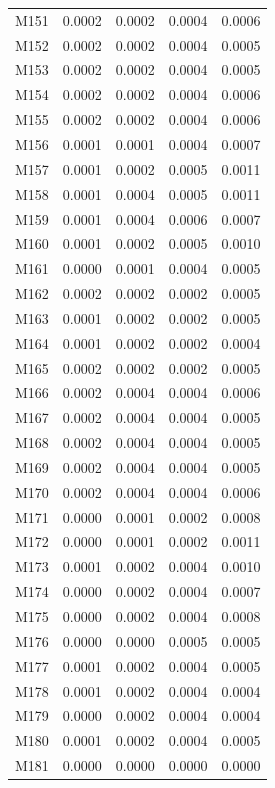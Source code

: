 \begin{longtable}{lrrrr}
M151 & 0.0002 & 0.0002 & 0.0004 & 0.0006 \\
M152 & 0.0002 & 0.0002 & 0.0004 & 0.0005 \\
M153 & 0.0002 & 0.0002 & 0.0004 & 0.0005 \\
M154 & 0.0002 & 0.0002 & 0.0004 & 0.0006 \\
M155 & 0.0002 & 0.0002 & 0.0004 & 0.0006 \\
M156 & 0.0001 & 0.0001 & 0.0004 & 0.0007 \\
M157 & 0.0001 & 0.0002 & 0.0005 & 0.0011 \\
M158 & 0.0001 & 0.0004 & 0.0005 & 0.0011 \\
M159 & 0.0001 & 0.0004 & 0.0006 & 0.0007 \\
M160 & 0.0001 & 0.0002 & 0.0005 & 0.0010 \\
M161 & 0.0000 & 0.0001 & 0.0004 & 0.0005 \\
M162 & 0.0002 & 0.0002 & 0.0002 & 0.0005 \\
M163 & 0.0001 & 0.0002 & 0.0002 & 0.0005 \\
M164 & 0.0001 & 0.0002 & 0.0002 & 0.0004 \\
M165 & 0.0002 & 0.0002 & 0.0002 & 0.0005 \\
M166 & 0.0002 & 0.0004 & 0.0004 & 0.0006 \\
M167 & 0.0002 & 0.0004 & 0.0004 & 0.0005 \\
M168 & 0.0002 & 0.0004 & 0.0004 & 0.0005 \\
M169 & 0.0002 & 0.0004 & 0.0004 & 0.0005 \\
M170 & 0.0002 & 0.0004 & 0.0004 & 0.0006 \\
M171 & 0.0000 & 0.0001 & 0.0002 & 0.0008 \\
M172 & 0.0000 & 0.0001 & 0.0002 & 0.0011 \\
M173 & 0.0001 & 0.0002 & 0.0004 & 0.0010 \\
M174 & 0.0000 & 0.0002 & 0.0004 & 0.0007 \\
M175 & 0.0000 & 0.0002 & 0.0004 & 0.0008 \\
M176 & 0.0000 & 0.0000 & 0.0005 & 0.0005 \\
M177 & 0.0001 & 0.0002 & 0.0004 & 0.0005 \\
M178 & 0.0001 & 0.0002 & 0.0004 & 0.0004 \\
M179 & 0.0000 & 0.0002 & 0.0004 & 0.0004 \\
M180 & 0.0001 & 0.0002 & 0.0004 & 0.0005 \\
M181 & 0.0000 & 0.0000 & 0.0000 & 0.0000 \\

\end{longtable}
